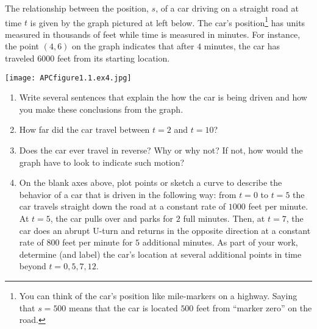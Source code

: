 \documentclass[handout]{ximera}
\begin{document}
\begin{problem}
The relationship between the position, $s$, of a car driving on a straight road at time $t$ is given by the graph pictured at left below. The car's position\footnote{You can think of the car's position like mile-markers on a highway.  Saying that $s = 500$ means that the car is located $500$ feet from ``marker zero'' on the road.\label{fn-1}} has units measured in thousands of feet while time is measured in minutes. For instance, the point $(4,6)$ on the graph indicates that after $4$ minutes, the car has traveled $6000$ feet from its starting location.%

\texttt{[image: APCfigure1.1.ex4.jpg]}

\begin{enumerate}[label=\alph*.]
\item Write several sentences that explain the how the car is being driven and how you make these conclusions from the graph.%
\item How far did the car travel between $t = 2$ and $t = 10$?%
\item Does the car ever travel in reverse?  Why or why not?  If not, how would the graph have to look to indicate such motion?%
\item On the blank axes above, plot points or sketch a curve to describe the behavior of a car that is driven in the following way:  from $t = 0$ to $t = 5$ the car travels straight down the road at a constant rate of $1000$ feet per minute.  At $t = 5$, the car pulls over and parks for $2$ full minutes.  Then, at $t = 7$, the car does an abrupt U-turn and returns in the opposite direction at a constant rate of $800$ feet per minute for $5$ additional minutes.  As part of your work, determine (and label) the car's location at several additional points in time beyond $t = 0, 5, 7, 12$.%

\end{enumerate}

\end{problem}
\end{document}
